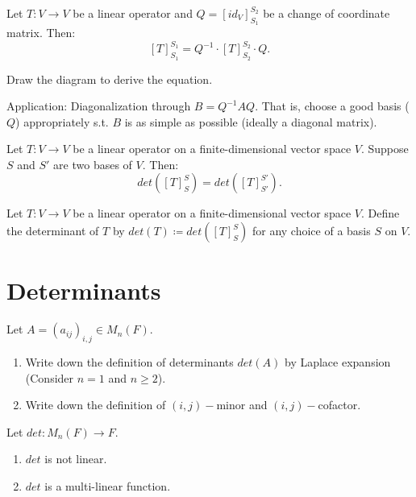 \documentclass[12pt]{article}
\begin{document}
\begin{theorem}
    Let $T:V\rightarrow V$ be a linear operator and $Q=[id_V]^{S_2}_{S_1}$ be a change of coordinate matrix. Then:
    \[[T]^{S_1}_{S_1}=Q^{-1}\cdot[T]^{S_2}_{S_2}\cdot Q.\]
\end{theorem}

\begin{pfbox}
    Draw the diagram to derive the equation.
\end{pfbox}

Application: Diagonalization through $B=Q^{-1}AQ$. That is, choose a good basis ($Q$) appropriately s.t. $B$ is as simple as possible (ideally a diagonal matrix).

\begin{theorem}
   Let $T:V\rightarrow V$ be a linear operator on a finite-dimensional vector space $V$.
   Suppose $S$ and $S'$ are two bases of $V$. Then:
   \[det([T]^{S}_{S})=det([T]^{S'}_{S'}).\]
\end{theorem}

\begin{definition}
     Let $T:V\rightarrow V$ be a linear operator on a finite-dimensional vector space $V$.
     Define the determinant of $T$ by $det(T)\coloneq det([T]^{S}_{S})$ for any choice of a basis $S$ on $V$.
\end{definition}


\newpage
\section{Determinants}

\begin{exercise}
    Let $A=(a_{ij})_{i,j}\in M_n(F).$
    \begin{enumerate}
        \item Write down the definition of determinants $det(A)$ by Laplace expansion (Consider $n=1$ and $n\geq 2$).
        \item Write down the definition of $(i,j)-$minor and $(i,j)-$cofactor.
    \end{enumerate}
\end{exercise}

\begin{remark}
 Let $det: M_n(F)\rightarrow F$. 
 \begin{enumerate}
    \item $det$ is not linear.
    \item $det$ is a multi-linear function.
 \end{enumerate}
\end{remark}
\end{document}
